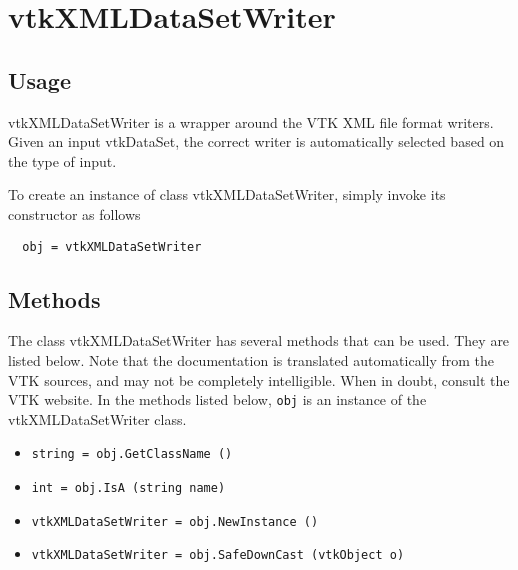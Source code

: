 \section{vtkXMLDataSetWriter}

\subsection{Usage}

 vtkXMLDataSetWriter is a wrapper around the VTK XML file format
 writers.  Given an input vtkDataSet, the correct writer is
 automatically selected based on the type of input.

To create an instance of class vtkXMLDataSetWriter, simply
invoke its constructor as follows
\begin{verbatim}
  obj = vtkXMLDataSetWriter
\end{verbatim}
\subsection{Methods}

The class vtkXMLDataSetWriter has several methods that can be used.
  They are listed below.
Note that the documentation is translated automatically from the VTK sources,
and may not be completely intelligible.  When in doubt, consult the VTK website.
In the methods listed below, \verb|obj| is an instance of the vtkXMLDataSetWriter class.
\begin{itemize}
\item  \verb|string = obj.GetClassName ()|

\item  \verb|int = obj.IsA (string name)|

\item  \verb|vtkXMLDataSetWriter = obj.NewInstance ()|

\item  \verb|vtkXMLDataSetWriter = obj.SafeDownCast (vtkObject o)|

\end{itemize}
